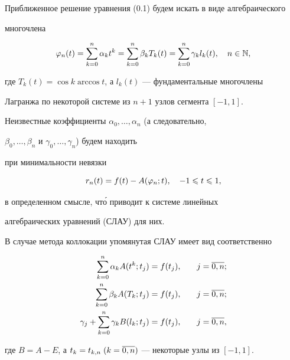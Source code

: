 Приближенное решение уравнения (0.1) будем искать в виде алгебраического 


многочлена


\begin{equation}


\vp_n(t)=\sum_{k=0}^n \alpha_k t^k = \sum_{k=0}^n \beta_k T_k(t)=


\suml_{k=0}^n\gamma_kl_k(t),\quad n\in \N,


\end{equation}


где $T_k(t)=\cos k \arccos t$, а $l_k(t)$ --- фундаментальные многочлены 


Лагранжа по некоторой системе из $n+1$ узлов сегмента $[-1,1]$. 


Неизвестные коэффициенты $\alpha_0,\dots,\alpha_n$ (а следовательно,


$\beta_0,\dotsc,\beta_n$ и $\gamma_0,\dotsc,\gamma_n$) будем находить 


при минимальности невязки 


\begin{equation}


r_n(t)=f(t)-A(\vp_n;t),\quad


-1\lea t\lea 1,


\end{equation}


в определенном смысле, чт\'о приводит к системе линейных 


алгебраических уравнений (СЛАУ) для них.





В случае метода коллокации упомянутая СЛАУ имеет вид соответственно


\begin{alignat}{2}


\suml_{k=0}^n\alpha_k A(t^k;t_j) &= f(t_j),&\quad j&=\ol{0,n};\\


%


\suml_{k=0}^n \beta_k A (T_k;t_j) &= f(t_j),&\quad j&=\ol{0,n}; \\


%


\gamma_j+\suml_{k=0}^n\gamma_kB(l_k;t_j) &= f(t_j),&\quad j&=\ol{0,n},


\end{alignat}


где $B=A-E$, а $t_k = t_{k,n}\;(k=\overline{0,n})$ --- некоторые узлы из $[-1,1]$. 





